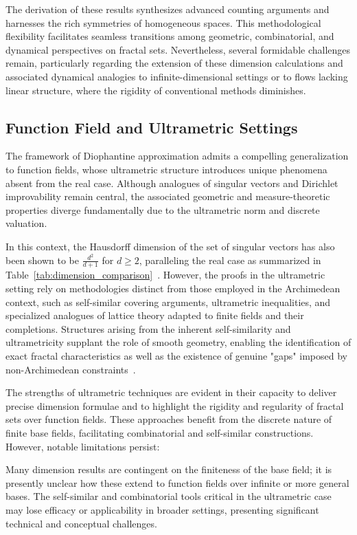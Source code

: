 \documentclass[sigconf]{acmart}
\begin{document}
The derivation of these results synthesizes advanced counting arguments and harnesses the rich symmetries of homogeneous spaces. This methodological flexibility facilitates seamless transitions among geometric, combinatorial, and dynamical perspectives on fractal sets. Nevertheless, several formidable challenges remain, particularly regarding the extension of these dimension calculations and associated dynamical analogies to infinite-dimensional settings or to flows lacking linear structure, where the rigidity of conventional methods diminishes.

\subsection{Function Field and Ultrametric Settings}

The framework of Diophantine approximation admits a compelling generalization to function fields, whose ultrametric structure introduces unique phenomena absent from the real case. Although analogues of singular vectors and Dirichlet improvability remain central, the associated geometric and measure-theoretic properties diverge fundamentally due to the ultrametric norm and discrete valuation.

In this context, the Hausdorff dimension of the set of singular vectors has also been shown to be $\frac{d^2}{d+1}$ for $d \geq 2$, paralleling the real case as summarized in Table~\ref{tab:dimension_comparison}~\cite{ref79}. However, the proofs in the ultrametric setting rely on methodologies distinct from those employed in the Archimedean context, such as self-similar covering arguments, ultrametric inequalities, and specialized analogues of lattice theory adapted to finite fields and their completions. Structures arising from the inherent self-similarity and ultrametricity supplant the role of smooth geometry, enabling the identification of exact fractal characteristics as well as the existence of genuine "gaps" imposed by non-Archimedean constraints~\cite{ref79}.

The strengths of ultrametric techniques are evident in their capacity to deliver precise dimension formulae and to highlight the rigidity and regularity of fractal sets over function fields. These approaches benefit from the discrete nature of finite base fields, facilitating combinatorial and self-similar constructions. However, notable limitations persist:

Many dimension results are contingent on the finiteness of the base field; it is presently unclear how these extend to function fields over infinite or more general bases.
The self-similar and combinatorial tools critical in the ultrametric case may lose efficacy or applicability in broader settings, presenting significant technical and conceptual challenges.
\end{document}

